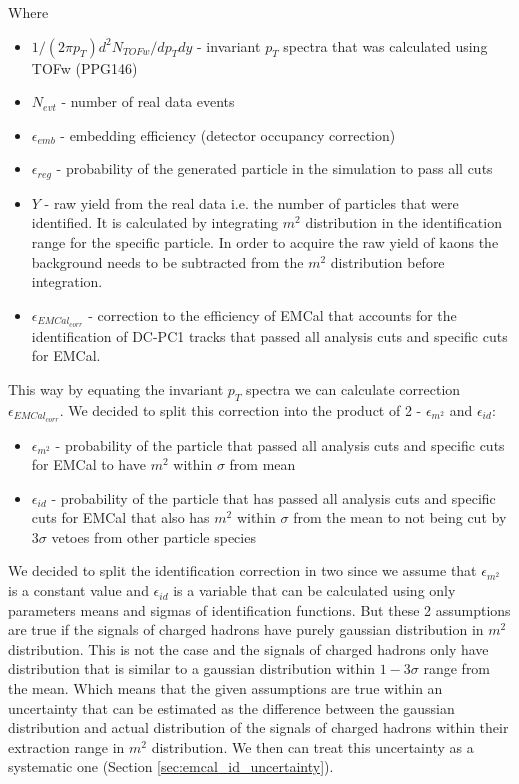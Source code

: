 Where
\begin{itemize}
	\item $1/(2 \pi p_T)d^2N_{TOFw}/dp_T dy$ - invariant $p_T$ spectra that was calculated using TOFw (PPG146)
	\item $N_{evt}$ - number of real data events
	\item $\epsilon_{emb}$ - embedding efficiency (detector occupancy correction)
	\item $\epsilon_{reg}$ - probability of the generated particle in the simulation to pass all cuts
	\item $Y$ - raw yield from the real data i.e. the number of particles that were identified. It is calculated by integrating $m^2$ distribution in the identification range for the specific particle. In order to acquire the raw yield of kaons the background needs to be subtracted from the $m^2$ distribution before integration.
	\item $\epsilon_{EMCal_{corr}}$ - correction to the efficiency of EMCal that accounts for the identification of DC-PC1 tracks that passed all analysis cuts and specific cuts for EMCal.
\end{itemize}

This way by equating the invariant $p_T$ spectra we can calculate correction $\epsilon_{EMCal_{corr}}$. We decided to split this correction into the product of 2 - $\epsilon_{m^2}$ and $\epsilon_{id}$:

\begin{itemize}
	\item $\epsilon_{m^2}$ - probability of the particle that passed all analysis cuts and specific cuts for EMCal to have $m^2$ within $\sigma$ from mean
	\item $\epsilon_{id}$ - probability of the particle that has passed all analysis cuts and specific cuts for EMCal that also has $m^2$ within $\sigma$ from the mean to not being cut by $3\sigma$ vetoes from other particle species
\end{itemize}

We decided to split the identification correction in two since we assume that $\epsilon_{m^2}$ is a constant value and $\epsilon_{id}$ is a variable that can be calculated using only parameters means and sigmas of identification functions. But these 2 assumptions are true if the signals of charged hadrons have purely gaussian distribution in $m^2$ distribution. This is not the case and the signals of charged hadrons only have distribution that is similar to a gaussian distribution within $1-3\sigma$ range from the mean. Which means that the given assumptions are true within an uncertainty that can be estimated as the difference between the gaussian distribution and actual distribution of the signals of charged hadrons within their extraction range in $m^2$ distribution. We then can treat this uncertainty as a systematic one (Section \ref{sec:emcal_id_uncertainty}).

